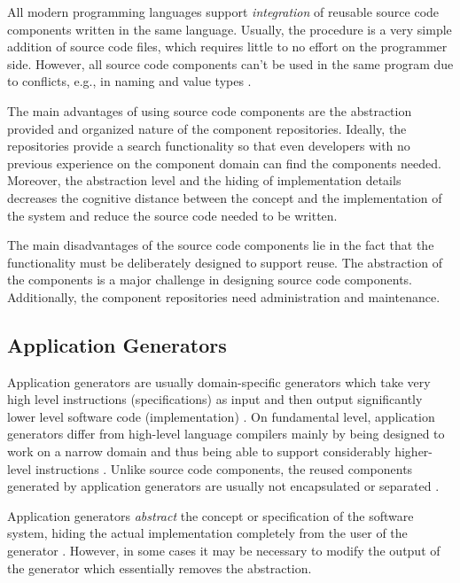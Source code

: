 All modern programming languages support \emph{integration} of reusable source code components written in the same language. Usually, the procedure is a very simple addition of source code files, which requires little to no effort on the programmer side. However, all source code components can't be used in the same program due to conflicts, e.g., in naming and value types \citep[chap.~5]{krueger_software_1992}.

The main advantages of using source code components are the abstraction provided and organized nature of the component repositories. Ideally, the repositories provide a search functionality so that even developers with no previous experience on the component domain can find the components needed. Moreover, the abstraction level and the hiding of implementation details decreases the cognitive distance between the concept and the implementation of the system and reduce the source code needed to be written.

The main disadvantages of the source code components lie in the fact that the functionality must be deliberately designed to support reuse. The abstraction of the components is a major challenge \citep[chap.~5]{krueger_software_1992} in designing source code components. Additionally, the component repositories need administration and maintenance.

\subsection{Application Generators}

Application generators are usually domain-specific generators which take very high level instructions (specifications) as input and then output significantly lower level software code (implementation) \citep[chap.~7]{cleaveland_building_1988,krueger_software_1992}. On fundamental level, application generators differ from high-level language compilers mainly by being designed to work on a narrow domain and thus being able to support considerably higher-level instructions \citep[chap.~7]{krueger_software_1992}. Unlike source code components, the reused components generated by application generators are usually not encapsulated or separated \citep[chap.~3]{sametinger_software_1997}.

Application generators \emph{abstract} the concept or specification of the software system, hiding the actual implementation completely from the user of the generator \citep{cleaveland_building_1988}. However, in some cases it may be necessary to modify the output of the generator which essentially removes the abstraction.

